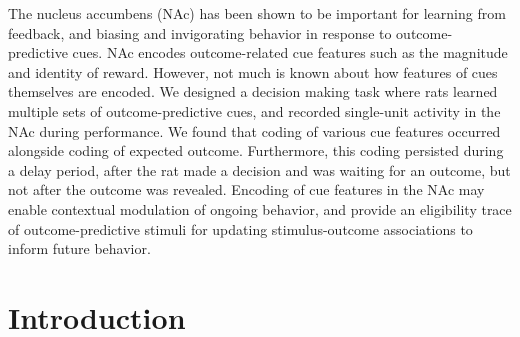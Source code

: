 \documentclass[11pt]{article}
\begin{document}
The nucleus accumbens (NAc) has been shown to be important for
learning from feedback, and biasing and invigorating behavior in
response to outcome-predictive cues. NAc encodes outcome-related cue
features such as the magnitude and identity of reward. However, not
much is known about how features of cues themselves are encoded.  We
designed a decision making task where rats learned multiple sets of
outcome-predictive cues, and recorded single-unit activity in the NAc
during performance. We found that coding of various cue features
occurred alongside coding of expected outcome. Furthermore, this
coding persisted during a delay period, after the rat made a decision
and was waiting for an outcome, but not after the outcome was
revealed. Encoding of cue features in the NAc may enable contextual
modulation of ongoing behavior, and provide an eligibility trace of
outcome-predictive stimuli for updating stimulus-outcome associations
to inform future behavior.

\newpage

\section*{Introduction}
\end{document}
